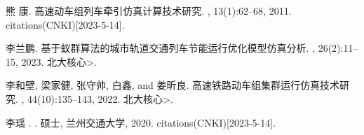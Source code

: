 \documentclass[12pt,a4paper]{nmmcm}
\begin{document}
\begin{thebibliography}{99}
熊 康.
\newblock 高速动车组列车牵引仿真计算技术研究.
, 13(1):62--68, 2011.
 citations(CNKI)[2023-5-14].

 李兰鹏.
\newblock
  基于蚁群算法的城市轨道交通列车节能运行优化模型仿真分析.
, 26(2):11--15, 2023.
\newblock {\textless}北大核心{\textgreater}.

 李和壁,  梁家健,  张守帅,  白鑫, and  姜昕良.
\newblock 高速铁路动车组集群运行仿真技术研究.
, 44(10):135--143, 2022.
\newblock {\textless}北大核心{\textgreater}.

李瑶 .
.
\newblock 硕士, 兰州交通大学, 2020.
 citations(CNKI)[2023-5-14].
\end{thebibliography}








\end{document}
